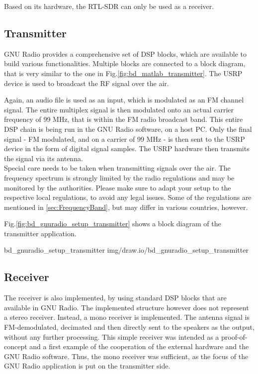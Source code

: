 Based on its hardware, the RTL-SDR can only be used as a receiver.

\subsection{Transmitter}

GNU Radio provides a comprehensive set of DSP blocks, which are available to build various functionalities.
Multiple blocks are connected to a block diagram, that is very similar to the one in Fig.\ref{fig:bd_matlab_transmitter}.
The USRP device is used to broadcast the RF signal over the air.

Again, an audio file is used as an input, which is modulated as an FM channel signal.
The entire multiplex signal is then modulated onto an actual carrier frequency of 99 MHz, that is within the FM radio broadcast band.
This entire DSP chain is being run in the GNU Radio software, on a host PC.
Only the final signal - FM modulated, and on a carrier of 99 MHz - is then sent to the USRP device in the form of digital signal samples.
The USRP hardware then transmits the signal via its antenna.\\

\noindent
Special care needs to be taken when transmitting signals over the air.
The frequency spectrum is strongly limited by the radio regulations and may be monitored by the authorities.
Please make sure to adapt your setup to the respective local regulations, to avoid any legal issues.
Some of the regulations are mentioned in \ref{sec:FrequencyBand}, but may differ in various countries, however.

Fig.\ref{fig:bd_gnuradio_setup_transmitter} shows a block diagram of the transmitter application.

 {bd_gnuradio_setup_transmitter} {img/draw.io/bd_gnuradio_setup_transmitter}


\subsection{Receiver}

The receiver is also implemented, by using standard DSP blocks that are available in GNU Radio.
The implemented structure however does not represent a stereo receiver.
Instead, a mono receiver is implemented.
The antenna signal is FM-demodulated, decimated and then directly sent to the speakers as the output, without any further processing.
This simple receiver was intended as a proof-of-concept and a first example of the cooperation of the external hardware and the GNU Radio software.
Thus, the mono receiver was sufficient, as the focus of the GNU Radio application is put on the transmitter side.

